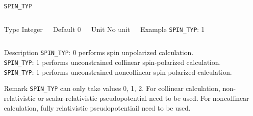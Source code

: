 \documentclass[xcolor=dvipsnames,t]{beamer}
\begin{document}
\begin{frame}[allowframebreaks]{\texttt{SPIN\_TYP}} \label{SPIN_TYP}
\vspace*{-12pt}
\begin{columns}
\begin{block}{Type}
Integer
\end{block}

\begin{block}{Default}
0
\end{block}

\begin{block}{Unit}
No unit
\end{block}

\begin{block}{Example}
\texttt{SPIN\_TYP}: 1
\end{block}
\end{columns}

\begin{block}{Description}
\texttt{SPIN\_TYP}: 0 performs spin unpolarized calculation. \\
\texttt{SPIN\_TYP}: 1 performs unconstrained collinear spin-polarized calculation.  \\
\texttt{SPIN\_TYP}: 1 performs unconstrained noncollinear spin-polarized calculation.   
\end{block}

\begin{block}{Remark}
\texttt{SPIN\_TYP} can only take values 0, 1, 2. For collinear calculation, non-relativistic or scalar-relativistic pseudopotential need to be used. For noncollinear calculation, fully relativistic pseudopotentiail need to be used. 
\end{block}

\end{frame}
\end{document}
